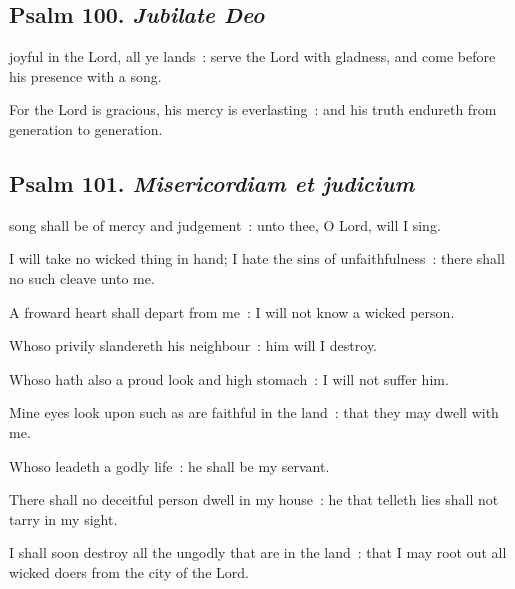 \subsection{Psalm 100. \textit{Jubilate Deo}}


 joyful in the Lord, all ye lands~: serve the Lord with gladness, and come before his presence with a song.\par
{}
For the Lord is gracious, his mercy is everlasting~: and his truth endureth from generation to generation.\par

\subsection{Psalm 101. \textit{Misericordiam et judicium}}


 song shall be of mercy and judgement~: unto thee, O Lord, will I sing.\par
{}
I will take no wicked thing in hand; I hate the sins of unfaithfulness~: there shall no such cleave unto me.\par
{}A froward heart shall depart from me~: I will not know a wicked person.\par
{}Whoso privily slandereth his neighbour~: him will I destroy.\par
{}Whoso hath also a proud look and high stomach~: I will not suffer him.\par
{}Mine eyes look upon such as are faithful in the land~: that they may dwell with me.\par
{}Whoso leadeth a godly life~: he shall be my servant.\par
{}There shall no deceitful person dwell in my house~: he that telleth lies shall not tarry in my sight.\par
{}I shall soon destroy all the ungodly that are in the land~: that I may root out all wicked doers from the city of the Lord.\par

